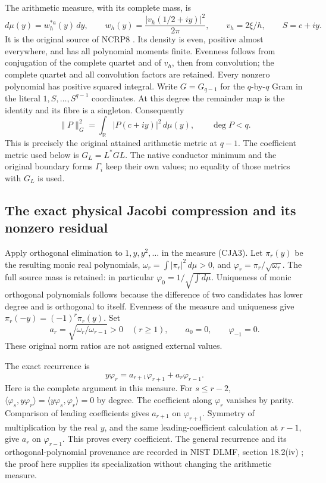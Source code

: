 The arithmetic measure, with its complete mass, is
\begin{equation}
 d\mu(y)=w_h^{*a}(y)\,dy,\qquad
 w_h(y)=\frac{|v_h(1/2+iy)|^2}{2\pi},\qquad
 v_h=2\xi/h,\qquad S=c+iy .
 \tag{CJA3}
\end{equation}
It is the original source of NCRP8 \cite{prog:NCRP}.
Its density is even, positive almost everywhere, and has all polynomial
moments finite.  Evenness follows from conjugation of the complete
quartet and of \(v_h\), then from convolution; the complete quartet and
all convolution factors are retained.
Every nonzero polynomial has positive squared integral.
Write \(G=G_{q-1}\) for the \(q\)-by-\(q\) Gram in the literal
\(1,S,\ldots,S^{q-1}\) coordinates.
At this degree the remainder map is the identity and its fibre is a
singleton.  Consequently
\begin{equation}
 \|P\|_G^2=\int_{\mathbb R}|P(c+iy)|^2\,d\mu(y),
 \qquad \deg P<q.
 \tag{CJA4}
\end{equation}
This is precisely the original attained arithmetic metric at \(q-1\).
The coefficient metric used below is \(G_L=L^*GL\).
The native conductor minimum and the original boundary forms
\(\Gamma_i\) keep their own values; no equality of those metrics with
\(G_L\) is used.

\subsection{The exact physical Jacobi compression and its nonzero residual}

Apply orthogonal elimination to \(1,y,y^2,\ldots\) in the measure
(CJA3).  Let \(\pi_r(y)\) be the resulting monic real polynomials,
\(\omega_r=\int|\pi_r|^2\,d\mu>0\), and
\(\varphi_r=\pi_r/\sqrt{\omega_r}\).
The full source mass is retained: in particular
\(\varphi_0=1/\sqrt{\int d\mu}\).
Uniqueness of monic orthogonal polynomials follows because the
difference of two candidates has lower degree and is orthogonal to
itself.  Evenness of the measure and uniqueness give
\(\pi_r(-y)=(-1)^r\pi_r(y)\).
Set
\begin{equation}
 a_r=\sqrt{\omega_r/\omega_{r-1}}>0\quad(r\geq1),\qquad
 a_0=0,\qquad\varphi_{-1}=0.
 \tag{CJA5}
\end{equation}
These original norm ratios are not assigned external values.

The exact recurrence is
\begin{equation}
 y\varphi_r=a_{r+1}\varphi_{r+1}+a_r\varphi_{r-1}.
 \tag{CJA6}
\end{equation}
Here is the complete argument in this measure.
For \(s\leq r-2\),
\(\langle\varphi_s,y\varphi_r\rangle
=\langle y\varphi_s,\varphi_r\rangle=0\) by degree.
The coefficient along \(\varphi_r\) vanishes by parity.
Comparison of leading coefficients gives \(a_{r+1}\) on
\(\varphi_{r+1}\).  Symmetry of multiplication by the real \(y\),
and the same leading-coefficient calculation at \(r-1\), give
\(a_r\) on \(\varphi_{r-1}\).
This proves every coefficient.
The general recurrence and its orthogonal-polynomial provenance are
recorded in NIST DLMF, section 18.2(iv)
\cite{human:dlmf18}; the proof here supplies its specialization
without changing the arithmetic measure.

